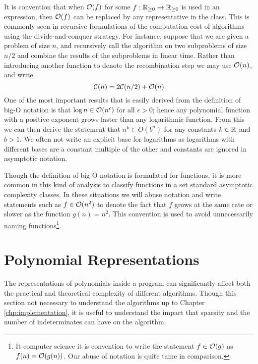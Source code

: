 It is convention that when $\mathcal O(f)$ for some $f: {\mathbb R}_{\ge 0} \to {\mathbb R}_{\ge 0}$ is used in an expression, then $\mathcal O(f)$ can be replaced by any representative in the class. This is commonly seen in recursive formulations of the computation cost of algorithms using the divide-and-conquer strategy. For instance, suppose that we are given a problem of size $n$, and recursively call the algorithm on two subproblems of size $n/2$ and combine the results of the subproblems in linear time. Rather than introducing another function to denote the recombination step we may use $\mathcal O(n)$, and write
\[
    \mathcal C(n) = 2\mathcal C(n/2) + \mathcal O(n)
\]
One of the most important results that is easily derived from the definition of big-O notation is that $\log n \in \mathcal O(n^\epsilon)$ for all $\epsilon > 0$; hence any polynomial function with a positive exponent grows faster than any logarithmic function. From this we can then derive the statement that $n^k \in O(b^n)$ for any constants $k \in {\mathbb R}$ and $b > 1$. We often not write an explicit base for logarithms as logarithms with different bases are a constant multiple of the other and constants are ignored in asymptotic notation.

Though the definition of big-O notation is formulated for functions, it is more common in this kind of analysis to classify functions in a set standard asymptotic complexity classes. In these situations we will abuse notation and write statements such as $f \in \mathcal O(n^2)$ to denote the fact that $f$ grows at the same rate or slower as the function $g(n) = n^2$. This convention is used to avoid unnecessarily naming functions\footnote{It computer science it is convention to write the statement $f \in \mathcal O(g)$ as $f(n) = \mathcal O(g(n))$. Our abuse of notation is quite tame in comparison.}.

\section{Polynomial Representations}

The representations of polynomials inside a program can significantly affect both the practical and theoretical complexity of different algorithms. Though this section not necessary to understand the algorithms up to Chapter \ref{chp:implementation}, it is useful to understand the impact that sparsity and the number of indeterminates can have on the algorithm.

